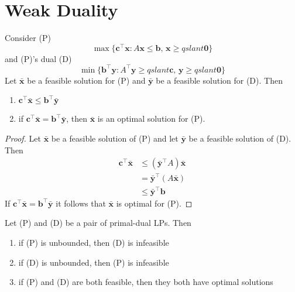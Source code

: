 \section{Weak Duality}
\begin{thmbox}
    \begin{theorem}
        Consider (P)
        \[ \max \{\bm{c}^{\top} \bm{x}: A \bm{x} \leqslant  \bm{b},\, \bm{x} \geqslant qslant  \bm{0}\} \]
        and (P)'s dual (D)
        \[ \min \{\bm{b}^{\top} \bm{y}: A^{\top} \bm{y} \geqslant qslant  \bm{c},\, \bm{y} \geqslant qslant  \bm{0}\}\]
        Let $ \bm{\bar{x}} $ be a feasible solution for (P) and $ \bm{\bar{y}} $
        be a feasible solution for (D). Then
        \begin{enumerate}[(1)]
            \item $ \bm{c}^\top \bm{\bar{x}}\leqslant \bm{b}^\top \bm{\bar{y}} $
            \item if $ \bm{c}^\top \bm{\bar{x}}=\bm{b}^\top \bm{\bar{y}} $, then
                  $ \bm{\bar{x}} $ is an optimal solution for (P).
        \end{enumerate}
    \end{theorem}
\end{thmbox}

\begin{proof}
    Let $ \bm{\bar{x}} $ be a feasible solution of (P) and let $ \bm{\bar{y}} $
    be a feasible solution of (D). Then
    \begin{align*}
        \bm{c}^\top \bm{\bar{x}}
         & \leqslant (\bm{\bar{y}}^\top A)\bm{\bar{x}} \\
         & = \bm{\bar{y}}^\top (A\bm{\bar{x}})         \\
         & \leqslant \bm{\bar{y}}^\top \bm{b}
    \end{align*}
    If $ \bm{c}^\top \bm{\bar{x}}=\bm{b}^\top \bm{\bar{y}} $ it follows
    that $ \bm{\bar{x}} $ is optimal for (P).
\end{proof}

\begin{thmbox}
    \begin{theorem}
        Let (P) and (D) be a pair of primal-dual LPs. Then
        \begin{enumerate}[(1)]
            \item if (P) is unbounded, then (D) is infeasible
            \item if (D) is unbounded, then (P) is infeasible
            \item if (P) and (D) are both feasible, then they both
                  have optimal solutions
        \end{enumerate}
    \end{theorem}
\end{thmbox}

